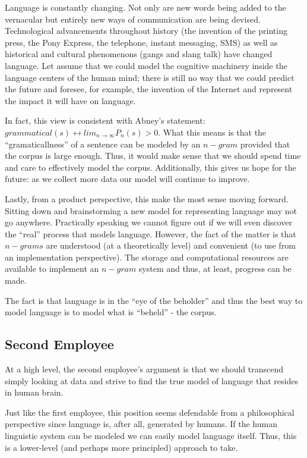 \documentclass[11pt]{article}
\begin{document}
Language is constantly changing. Not only are new words being added to the vernacular but entirely new ways of communication are being devised. Technological advancements throughout history (the invention of the printing press, the Pony Express, the telephone, instant messaging, SMS) as well as historical and cultural phenomenons (gangs and slang talk) have changed language. Let assume that we could model the cognitive machinery inside the language centers of the human mind; there is still no way that we could predict the future and foresee, for example, the invention of the Internet and represent the impact it will have on language.

In fact, this view is consistent with Abney's statement: $grammatical(s) \leftrightarrow lim_{n \to \infty}P_n(s) > 0$. What this means is that the ``gramaticallness'' of a sentence can be modeled by an $n-gram$ provided that the corpus is large enough. Thus, it would make sense that we should spend time and care to effectively model the corpus. Additionally, this gives us hope for the future: as we collect more data our model will continue to improve.

Lastly, from a product perspective, this make the most sense moving forward. Sitting down and brainstorming a new model for representing language may not go anywhere. Practically speaking we cannot figure out if we will even discover the ``real'' process that models language. However, the fact of the matter is that $n-grams$ are understood (at a theoretically level) and convenient (to use from an implementation perspective). The storage and computational resources are available to implement an $n-gram$ system and thus, at least, progress can be made. 

The fact is that language is in the ``eye of the beholder'' and thus the best way to model language is to model what is ``beheld'' - the corpus.

\newpage

\subsection* {Second Employee}

At a high level, the second employee's argument is that we should transcend simply looking at data and strive to find the true model of language that resides in human brain. 

Just like the first employee, this position seems defendable from a philosophical perspective since language is, after all, generated by humans. If the human linguistic system can be modeled we can easily model language itself. Thus, this is a lower-level (and perhaps more principled) approach to take.
\end{document}
